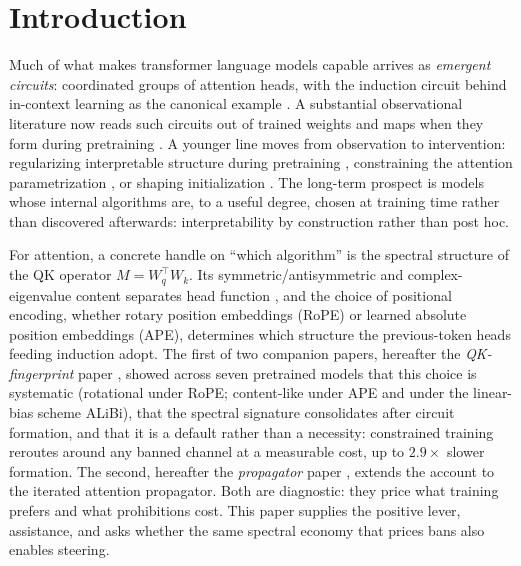 \documentclass[11pt]{article}
\newcommand{\Rope}{RoPE\xspace}
\newcommand{\M}{\ensuremath{M}\xspace}
\begin{document}
\section{Introduction}
Much of what makes transformer language models \citep{vaswani2017attention} capable arrives as \emph{emergent
circuits}: coordinated groups of attention heads, with the induction circuit behind in-context learning as the
canonical example \citep{elhage2021framework,olsson2022induction,wang2022ioi}. A substantial observational
literature now reads such circuits out of trained weights and maps when they form during pretraining
\citep{tigges2024llm,bietti2023birth,reddy2024mechanistic,singh2024needs,huang2026dissecting}. A younger line
moves from observation to intervention: regularizing interpretable structure during pretraining
\citep{chen2024sudden}, constraining the attention parametrization \citep{kitaev2020reformer,courtois2024symmetric},
or shaping initialization \citep{saponati2025}. The long-term prospect is models whose internal algorithms are, to
a useful degree, chosen at training time rather than discovered afterwards: interpretability by
construction rather than post hoc.

For attention, a concrete handle on ``which algorithm'' is the spectral structure of the QK operator
$\M = W_q^\top W_k$. Its symmetric/antisymmetric and complex-eigenvalue content separates head function
\citep{saponati2025,millidge2022svd,jamil2026routing}, and the choice of positional encoding, whether rotary
position embeddings (\Rope) \citep{su2021roformer,barbero2025rope,urrutia2025decoupling} or learned absolute
position embeddings (APE), determines which structure the previous-token heads feeding induction adopt. The first
of two companion papers, hereafter the \emph{QK-fingerprint} paper \citep{li2026fingerprint}, showed across seven
pretrained models that this choice is systematic (rotational under \Rope; content-like under APE and under the
linear-bias scheme ALiBi), that the spectral signature consolidates after circuit formation, and that it is
a default rather than a necessity: constrained training reroutes around any banned channel at a measurable
cost, up to $2.9\times$ slower formation. The second, hereafter the \emph{propagator} paper
\citep{li2026pseudospectra}, extends the account to the iterated attention propagator. Both are diagnostic: they
price what training prefers and what prohibitions cost. This paper supplies the positive lever, assistance, and
asks whether the same spectral economy that prices bans also enables steering.
\end{document}
